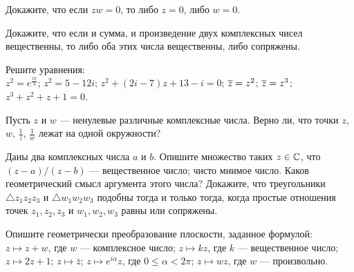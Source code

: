 \documentclass[a4paper,12pt]{article}
\begin{document}


Докажите, что если $zw=0$, то либо $z=0$, либо $w=0$.

Докажите, что если и сумма, и произведение двух комплексных чисел вещественны, то либо оба этих числа вещественны, либо сопряжены.






Решите уравнения:\\
$z^2=e^{\frac{i \pi}{3}}$;
$z^2=5-12i$;
$z^2+(2i-7)z+13-i=0$;
$\overline z=z^2$;
$\overline z=z^3$;
$z^3+z^2+z+1=0$.




Пусть $z$ и $w$ --- ненулевые различные комплексные числа. Верно ли, что точки $z$, $w$, $\frac1{\overline{z}}$, $\frac1{\overline{w}}$ лежат на одной окружности?





Даны два комплексных числа $a$ и $b$. Опишите множество таких $z\in\mathbb{C}$,
что $(z-a)/(z-b)$ —
вещественное число;
чисто мнимое число.
Каков геометрический смысл аргумента этого числа?
Докажите, что треугольники $\triangle z_1z_2z_3$ и $\triangle w_1w_2w_3$ подобны тогда и только тогда,
когда простые отношения точек $z_1, z_2, z_3$ и $w_1, w_2, w_3$ равны или сопряжены.

Опишите геометрически преобразование плоскости, заданное формулой:
{ $z\longmapsto z+w$, где $w$ --- комплексное число;}
{ $z\longmapsto kz$, где $k$ --- вещественное число;}
{ $z\longmapsto 2z+1$;}
{ $z\longmapsto \bar z$;}
{ $z\longmapsto e^{i \alpha }z$, где $0 \leq \alpha < 2\pi$;}
{ $z\longmapsto wz$, где $w$ --- произвольно.}
\end{document}

